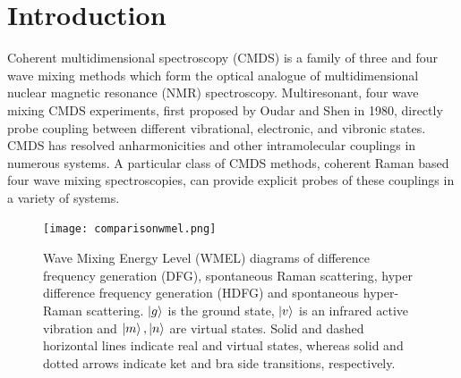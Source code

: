 \documentclass[aip, jcp, reprint, onecolumn]{revtex4-2}
\begin{document}
\section{Introduction}
Coherent multidimensional spectroscopy (CMDS) is a family of three and four wave mixing methods which form the optical analogue of multidimensional nuclear magnetic resonance (NMR) spectroscopy.\cite{RN103, Cho2008, RN335}
Multiresonant, four wave mixing CMDS experiments, first proposed by Oudar and Shen in 1980,\cite{RN307} directly probe coupling between different vibrational, electronic, and vibronic states. \cite{RN307, RN281, RN103, RN342, Cho2008, RN335, Ogilvie2019, RN325} 
CMDS has resolved anharmonicities and other intramolecular couplings in numerous systems. \cite{RN345, RN342, RN343, RN324, RN329, RN120, Czech2015, Gaynor2017, Ogilvie2019, RN325}
A particular class of CMDS methods, coherent Raman based four wave mixing spectroscopies, can provide explicit probes of these couplings in a variety of systems. \cite{RN103, RN335}

\begin{figure}[!htbp]
	\centering
	\texttt{[image: comparisonwmel.png]}
	\caption{Wave Mixing Energy Level (WMEL) diagrams of difference frequency generation (DFG), spontaneous Raman scattering, hyper difference frequency generation (HDFG) and spontaneous hyper-Raman scattering. \cite{RN286, RN352}
		$\ket{g}$ is the ground state, $\ket{v}$ is an infrared active vibration and $\ket{m}, \ket{n}$ are virtual states.
		Solid and dashed horizontal lines indicate real and virtual states, whereas solid and dotted arrows indicate ket and bra side transitions, respectively. 
		}
	\label{fig:comparisonwmel}
\end{figure}
\end{document}
